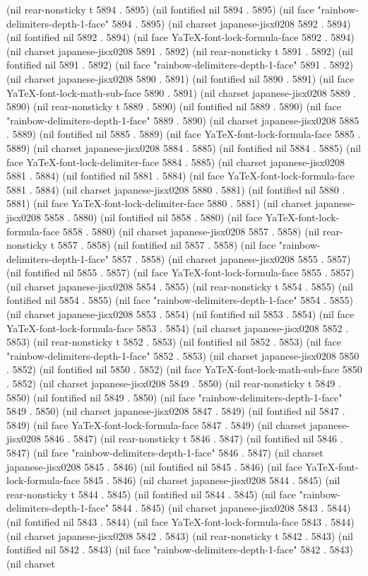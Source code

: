 (nil rear-nonsticky t 5894 . 5895) (nil fontified nil 5894 . 5895) (nil face "rainbow-delimiters-depth-1-face" 5894 . 5895) (nil charset japanese-jisx0208 5892 . 5894) (nil fontified nil 5892 . 5894) (nil face YaTeX-font-lock-formula-face 5892 . 5894) (nil charset japanese-jisx0208 5891 . 5892) (nil rear-nonsticky t 5891 . 5892) (nil fontified nil 5891 . 5892) (nil face "rainbow-delimiters-depth-1-face" 5891 . 5892) (nil charset japanese-jisx0208 5890 . 5891) (nil fontified nil 5890 . 5891) (nil face YaTeX-font-lock-math-sub-face 5890 . 5891) (nil charset japanese-jisx0208 5889 . 5890) (nil rear-nonsticky t 5889 . 5890) (nil fontified nil 5889 . 5890) (nil face "rainbow-delimiters-depth-1-face" 5889 . 5890) (nil charset japanese-jisx0208 5885 . 5889) (nil fontified nil 5885 . 5889) (nil face YaTeX-font-lock-formula-face 5885 . 5889) (nil charset japanese-jisx0208 5884 . 5885) (nil fontified nil 5884 . 5885) (nil face YaTeX-font-lock-delimiter-face 5884 . 5885) (nil charset japanese-jisx0208 5881 . 5884) (nil fontified nil 5881 . 5884) (nil face YaTeX-font-lock-formula-face 5881 . 5884) (nil charset japanese-jisx0208 5880 . 5881) (nil fontified nil 5880 . 5881) (nil face YaTeX-font-lock-delimiter-face 5880 . 5881) (nil charset japanese-jisx0208 5858 . 5880) (nil fontified nil 5858 . 5880) (nil face YaTeX-font-lock-formula-face 5858 . 5880) (nil charset japanese-jisx0208 5857 . 5858) (nil rear-nonsticky t 5857 . 5858) (nil fontified nil 5857 . 5858) (nil face "rainbow-delimiters-depth-1-face" 5857 . 5858) (nil charset japanese-jisx0208 5855 . 5857) (nil fontified nil 5855 . 5857) (nil face YaTeX-font-lock-formula-face 5855 . 5857) (nil charset japanese-jisx0208 5854 . 5855) (nil rear-nonsticky t 5854 . 5855) (nil fontified nil 5854 . 5855) (nil face "rainbow-delimiters-depth-1-face" 5854 . 5855) (nil charset japanese-jisx0208 5853 . 5854) (nil fontified nil 5853 . 5854) (nil face YaTeX-font-lock-formula-face 5853 . 5854) (nil charset japanese-jisx0208 5852 . 5853) (nil rear-nonsticky t 5852 . 5853) (nil fontified nil 5852 . 5853) (nil face "rainbow-delimiters-depth-1-face" 5852 . 5853) (nil charset japanese-jisx0208 5850 . 5852) (nil fontified nil 5850 . 5852) (nil face YaTeX-font-lock-math-sub-face 5850 . 5852) (nil charset japanese-jisx0208 5849 . 5850) (nil rear-nonsticky t 5849 . 5850) (nil fontified nil 5849 . 5850) (nil face "rainbow-delimiters-depth-1-face" 5849 . 5850) (nil charset japanese-jisx0208 5847 . 5849) (nil fontified nil 5847 . 5849) (nil face YaTeX-font-lock-formula-face 5847 . 5849) (nil charset japanese-jisx0208 5846 . 5847) (nil rear-nonsticky t 5846 . 5847) (nil fontified nil 5846 . 5847) (nil face "rainbow-delimiters-depth-1-face" 5846 . 5847) (nil charset japanese-jisx0208 5845 . 5846) (nil fontified nil 5845 . 5846) (nil face YaTeX-font-lock-formula-face 5845 . 5846) (nil charset japanese-jisx0208 5844 . 5845) (nil rear-nonsticky t 5844 . 5845) (nil fontified nil 5844 . 5845) (nil face "rainbow-delimiters-depth-1-face" 5844 . 5845) (nil charset japanese-jisx0208 5843 . 5844) (nil fontified nil 5843 . 5844) (nil face YaTeX-font-lock-formula-face 5843 . 5844) (nil charset japanese-jisx0208 5842 . 5843) (nil rear-nonsticky t 5842 . 5843) (nil fontified nil 5842 . 5843) (nil face "rainbow-delimiters-depth-1-face" 5842 . 5843) (nil charset 